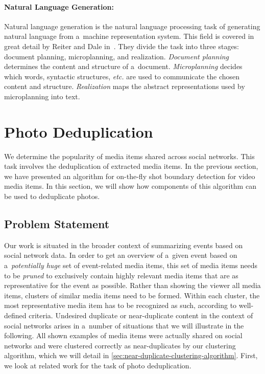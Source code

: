 \paragraph{Natural Language Generation:}

Natural language generation is the natural language processing task
of generating natural language from a~machine representation system.
This field is covered in great detail by Reiter and Dale
in~\cite{reiter2000building}.
They divide the task into three stages:
document planning, microplanning, and realization.
\emph{Document planning} determines the content and structure of a~document.
\emph{Microplanning} decides which words, syntactic structures,
\emph{etc.} are used to communicate the chosen content and structure.
\emph{Realization} maps the abstract representations
used by microplanning into text.

\section{Photo Deduplication}
\label{sec:photo-deduplication}

We determine the popularity of media items
shared across social networks.
This task involves the deduplication of extracted media items.
In the previous section, we have presented an algorithm
for on-the-fly shot boundary detection for video media items.
In this section, we will show how components of this algorithm
can be used to deduplicate photos.

\subsection{Problem Statement}
\label{sec:problem-statement}

Our work is situated in the broader context of summarizing events
based on social network data.
In order to get an overview of a~given event based on a~\emph{potentially huge} set
of event-related media items, this set of media items needs to be \emph{pruned}
to exclusively contain highly relevant media items that are as representative
for the event as possible.
Rather than showing the viewer all media items,
clusters of similar media items need to be formed.
Within each cluster, the most representative media item
has to be recognized as such, according to well-defined criteria.
Undesired duplicate or near-duplicate content in the context of social networks
arises in a~number of situations
that we will illustrate in the following.
All shown examples of media items were actually shared on social networks
and were clustered correctly as near-duplicates
by our clustering algorithm, which we will detail in
\autoref{sec:near-duplicate-clustering-algorithm}.
First, we look at related work for the task of photo deduplication.

